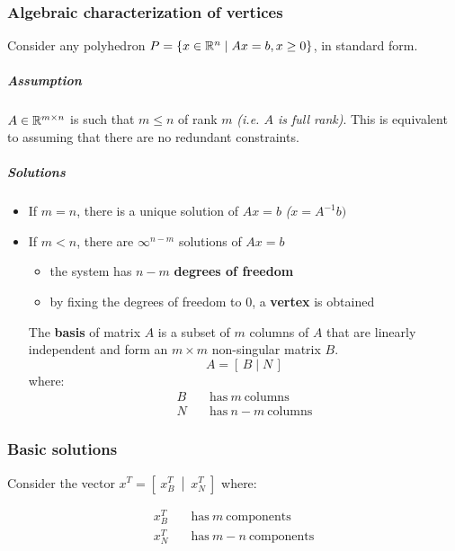 \documentclass[english]{article}
\begin{document}
\subsubsection{Algebraic characterization of vertices}

Consider any polyhedron \(P = \left\{ x \in \mathbb{R}^n \mid   Ax = b, x \geq 0 \right\}\), in standard form.

\subparagraph*{Assumption}
\(A \in \mathbb{R}^{m \times n}\) is such that \(m \leq n\) of rank \(m\) \textit{(i.e. \(A\) is full rank)}.
This is equivalent to assuming that there are no redundant constraints.

\subparagraph*{Solutions}
\begin{itemize}
  \item If \(m = n\), there is a unique solution of \(Ax = b\) \textit{(\(x = A^{-1} b)\)}
  \item If \(m < n\), there are \(\infty^{n-m}\) solutions of \(Ax = b\)
        \begin{itemize}
          \item the system has \(n-m\) \textbf{degrees of freedom}
          \item by fixing the degrees of freedom to \(0\), a \textbf{vertex} is obtained
        \end{itemize}

        The \textbf{basis} of matrix \(A\) is a subset of \(m\) columns of \(A\) that are linearly independent and form an \(m \times m\) non-singular matrix \(B\).
        \[ A = [\, B \mid N \, ] \]
        where:
        \begin{align*}
          B \quad & \text{has} \ m \ \text{columns}   \\
          N \quad & \text{has} \ n-m \ \text{columns}
        \end{align*}
\end{itemize}

\subsubsection{Basic solutions}
\label{sec:basic-solutions}

Consider the vector \(x^T = \left[ \ x_B^T \ \middle\vert \ x_N^T \ \right]\) where:

\begin{align*}
  x_B^T \quad & \text{has} \ m \ \text{components}   \\
  x_N^T \quad & \text{has} \ m-n \ \text{components}
\end{align*}
\end{document}
